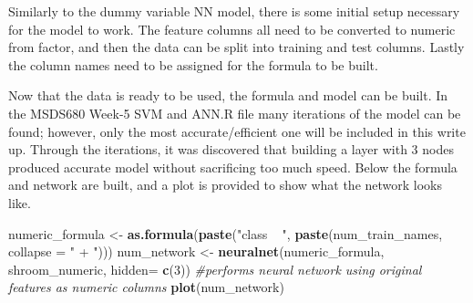 \documentclass[
  english,
  man]{apa6}
\newenvironment{Shaded}{\begin{snugshade}}{\end{snugshade}}
\newcommand{\CommentTok}[1]{\textcolor[rgb]{0.56,0.35,0.01}{\textit{#1}}}
\newcommand{\DataTypeTok}[1]{\textcolor[rgb]{0.13,0.29,0.53}{#1}}
\newcommand{\DecValTok}[1]{\textcolor[rgb]{0.00,0.00,0.81}{#1}}
\newcommand{\FloatTok}[1]{\textcolor[rgb]{0.00,0.00,0.81}{#1}}
\newcommand{\KeywordTok}[1]{\textcolor[rgb]{0.13,0.29,0.53}{\textbf{#1}}}
\newcommand{\NormalTok}[1]{#1}
\newcommand{\OperatorTok}[1]{\textcolor[rgb]{0.81,0.36,0.00}{\textbf{#1}}}
\newcommand{\OtherTok}[1]{\textcolor[rgb]{0.56,0.35,0.01}{#1}}
\newcommand{\StringTok}[1]{\textcolor[rgb]{0.31,0.60,0.02}{#1}}
\begin{document}
Similarly to the dummy variable NN model, there is some initial setup necessary for the model to work. The feature columns all need to be converted to numeric from factor, and then the data can be split into training and test columns. Lastly the column names need to be assigned for the formula to be built.

\begin{Shaded}
\end{Shaded}

Now that the data is ready to be used, the formula and model can be built. In the MSDS680 Week-5 SVM and ANN.R file many iterations of the model can be found; however, only the most accurate/efficient one will be included in this write up. Through the iterations, it was discovered that building a layer with 3 nodes produced accurate model without sacrificing too much speed. Below the formula and network are built, and a plot is provided to show what the network looks like.

\begin{Shaded}
\begin{Highlighting}[]
\NormalTok{numeric_formula <-}\StringTok{ }\KeywordTok{as.formula}\NormalTok{(}\KeywordTok{paste}\NormalTok{(}\StringTok{"class ~ "}\NormalTok{, }\KeywordTok{paste}\NormalTok{(num_train_names, }\DataTypeTok{collapse =} \StringTok{" + "}\NormalTok{)))}
\NormalTok{num_network <-}\StringTok{ }\KeywordTok{neuralnet}\NormalTok{(numeric_formula, shroom_numeric, }\DataTypeTok{hidden=} \KeywordTok{c}\NormalTok{(}\DecValTok{3}\NormalTok{)) }\CommentTok{#performs neural network using original features as numeric columns}
\KeywordTok{plot}\NormalTok{(num_network)}
\end{Highlighting}
\end{Shaded}
\end{document}
